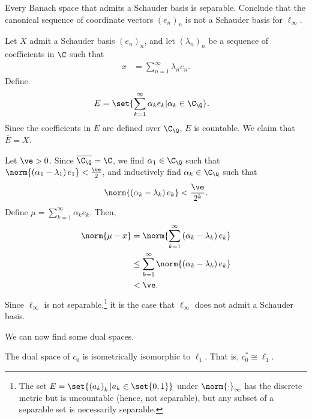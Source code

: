 \documentclass[10pt]{mypackage}
\begin{document}
\begin{exercise}
  Every Banach space that admits a Schauder basis is separable. Conclude that the canonical sequence of coordinate vectors $\left(e_n\right)_n$ is not a Schauder basis for $\ell_{\infty}$.
\end{exercise}
\begin{solution}
  Let $X$ admit a Schauder basis $\left(e_n\right)_n$, and let $\left(\lambda_n\right)_n$ be a sequence of coefficients in $\C$ such that
  \begin{align*}
    x &= \sum_{n=1}^{\infty}\lambda_ne_n.
  \end{align*}
  Define
  \begin{align*}
    E &= \set{\sum_{k=1}^{\infty}\alpha_ke_k| \alpha_k\in \C_{\Q}}.
  \end{align*}
  Since the coefficients in $E$ are defined over $\C_{\Q}$, $E$ is countable. We claim that $\overline{E} = X$.\newline

  Let $\ve > 0$. Since $\overline{\C_{\Q}} = \C$, we find $\alpha_1\in \C_{\Q}$ such that $\norm{\left(\alpha_1 - \lambda_1\right)e_1} < \frac{\ve}{2}$, and inductively find $\alpha_k\in \C_{\Q}$ such that
  \begin{align*}
    \norm{\left(\alpha_k - \lambda_k\right)e_k} < \frac{\ve}{2^k}.
  \end{align*}
  Define $\mu = \sum_{k=1}^{\infty}\alpha_ke_k$. Then,
  \begin{align*}
    \norm{\mu - x} &= \norm{\sum_{k=1}^{\infty}\left(\alpha_k - \lambda_k\right)e_k}\\
                   &\leq \sum_{k=1}^{\infty}\norm{\left(\alpha_k - \lambda_k\right)e_k}\\
                   &< \ve.
  \end{align*}
  Since $\ell_{\infty}$ is not separable,\footnote{The set $E = \set{\left(a_k\right)_k| a_k\in \set{0,1}}$ under $\norm{\cdot}_{\infty}$ has the discrete metric but is uncountable (hence, not separable), but any subset of a separable set is necessarily separable.} it is the case that $\ell_{\infty}$ does not admit a Schauder basis.
\end{solution}
We can now find some dual spaces.
\begin{proposition}
  The dual space of $c_0$ is isometrically isomorphic to $\ell_{1}$. That is, $c_0^{\ast} \cong \ell_1$.
\end{proposition}
\end{document}
